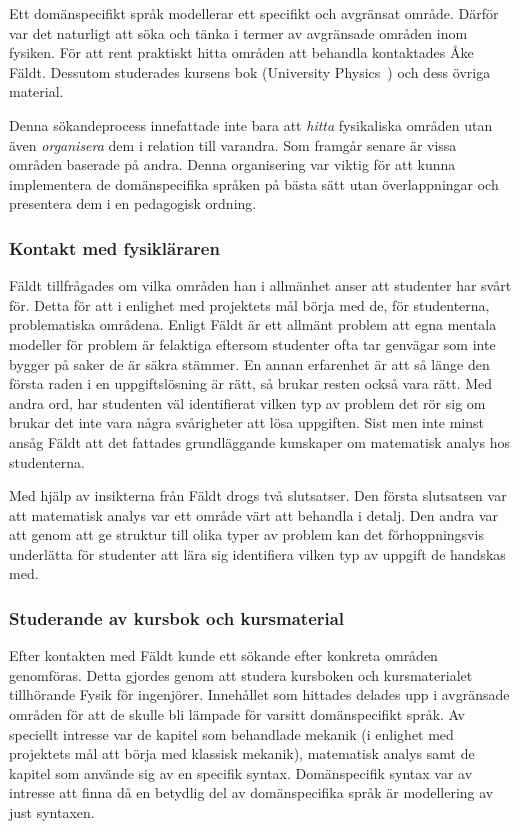 Ett domänspecifikt språk modellerar ett specifikt och avgränsat område. Därför
var det naturligt att söka och tänka i termer av avgränsade områden inom
fysiken. För att rent praktiskt hitta områden att behandla kontaktades Åke
Fäldt. Dessutom studerades kursens bok (University
Physics~\cite{UP}) och dess övriga material.

Denna sökandeprocess innefattade inte bara att \textit{hitta} fysikaliska
områden utan även \textit{organisera} dem i relation till varandra. Som framgår
senare är vissa områden baserade på andra. Denna organisering
var viktig för att kunna implementera de domänspecifika språken på bästa sätt utan överlappningar och presentera dem i en pedagogisk ordning.

\subsubsection*{Kontakt med fysikläraren}
\label{sec:kontakt_faldt}

Fäldt tillfrågades om vilka områden han i allmänhet anser att studenter har
svårt för. Detta för att i enlighet med projektets mål börja med de, för
studenterna, problematiska områdena. Enligt Fäldt är ett allmänt problem att
egna mentala modeller för problem är felaktiga eftersom studenter ofta tar
genvägar som inte bygger på saker de är säkra stämmer. En annan erfarenhet
är att så länge den första raden i en uppgiftslösning är rätt, så brukar
resten också vara rätt. Med andra ord, har studenten väl identifierat vilken typ av
problem det rör sig om brukar det inte vara några svårigheter att lösa
uppgiften. Sist men inte minst ansåg Fäldt att det fattades grundläggande
kunskaper om matematisk analys hos studenterna.

Med hjälp av insikterna från Fäldt drogs två slutsatser. Den första slutsatsen
var att matematisk analys var ett område värt att behandla i detalj. Den andra
var att genom att ge struktur till olika typer av problem kan det
förhoppningsvis underlätta för studenter att lära sig identifiera vilken
typ av uppgift de handskas med.

\subsubsection*{Studerande av kursbok och kursmaterial}

Efter kontakten med Fäldt kunde ett sökande efter konkreta områden genomföras.
Detta gjordes genom att studera kursboken och kursmaterialet tillhörande Fysik
för ingenjörer. Innehållet som hittades delades upp i avgränsade områden för att
de skulle bli lämpade för varsitt domänspecifikt språk. Av speciellt intresse
var de kapitel som behandlade mekanik (i enlighet med projektets mål att börja
med klassisk mekanik), matematisk analys samt de kapitel som använde sig av en
specifik syntax. Domänspecifik syntax var av intresse att finna
då en betydlig del av domänspecifika språk är modellering av just syntaxen.

